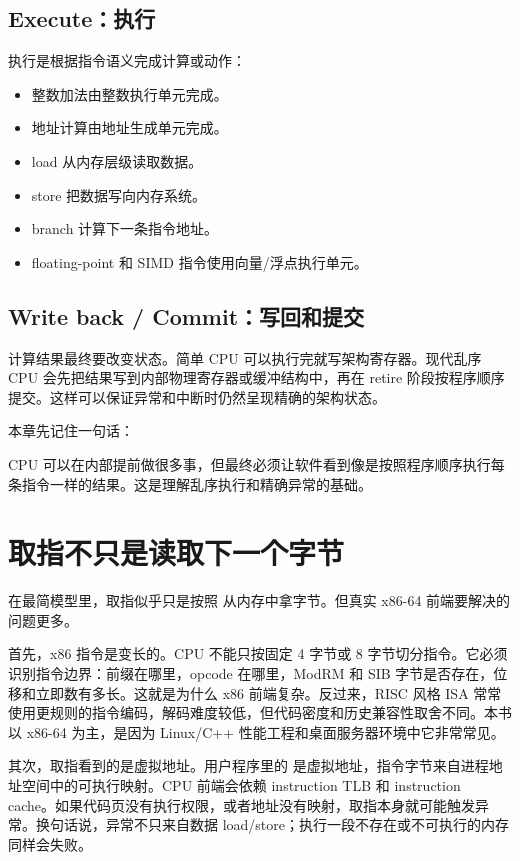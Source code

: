 \subsection{Execute：执行}

执行是根据指令语义完成计算或动作：

\begin{itemize}
  \item 整数加法由整数执行单元完成。
  \item 地址计算由地址生成单元完成。
  \item load 从内存层级读取数据。
  \item store 把数据写向内存系统。
  \item branch 计算下一条指令地址。
  \item floating-point 和 SIMD 指令使用向量/浮点执行单元。
\end{itemize}

\subsection{Write back / Commit：写回和提交}

计算结果最终要改变状态。简单 CPU 可以执行完就写架构寄存器。现代乱序 CPU 会先把结果写到内部物理寄存器或缓冲结构中，再在 retire 阶段按程序顺序提交。这样可以保证异常和中断时仍然呈现精确的架构状态。

本章先记住一句话：

\begin{keyidea}
CPU 可以在内部提前做很多事，但最终必须让软件看到像是按照程序顺序执行每条指令一样的结果。这是理解乱序执行和精确异常的基础。
\end{keyidea}

\section{取指不只是读取下一个字节}

在最简模型里，取指似乎只是按照  从内存中拿字节。但真实 x86-64 前端要解决的问题更多。

首先，x86 指令是变长的。CPU 不能只按固定 4 字节或 8 字节切分指令。它必须识别指令边界：前缀在哪里，opcode 在哪里，ModRM 和 SIB 字节是否存在，位移和立即数有多长。这就是为什么 x86 前端复杂。反过来，RISC 风格 ISA 常常使用更规则的指令编码，解码难度较低，但代码密度和历史兼容性取舍不同。本书以 x86-64 为主，是因为 Linux/C++ 性能工程和桌面服务器环境中它非常常见。

其次，取指看到的是虚拟地址。用户程序里的  是虚拟地址，指令字节来自进程地址空间中的可执行映射。CPU 前端会依赖 instruction TLB 和 instruction cache。如果代码页没有执行权限，或者地址没有映射，取指本身就可能触发异常。换句话说，异常不只来自数据 load/store；执行一段不存在或不可执行的内存同样会失败。

